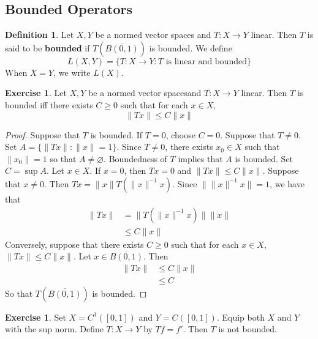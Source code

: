 \documentclass[12pt]{amsart}
\theoremstyle{definition}
\newtheorem{defn}[definition]{Definition}
\newtheorem{ex}[definition]{Exercise}
\newcommand{\lex}[1]{\label{ex:#1}}
\newcommand{\ld}[1]{\label{defn:#1}}
\begin{document}
	
	
	
	
	
	
	
	
	
	
	
	
	\newpage
	\subsection{Bounded Operators}
	
	\begin{defn} \ld{42001} 
		Let $X,Y$ be a normed vector spaces and $T:X \rightarrow Y$ linear. Then $T$ is said to be \textbf{bounded} if $T(\overline{B(0,1)})$ is bounded. We define $$L(X,Y) = \{T:X \rightarrow Y: T \text{ is linear and bounded}\}$$
		When $X=Y$, we write $L(X)$.
	\end{defn}
	
	\begin{ex} \ld{42001.1} 
		Let $X,Y$ be a normed vector spacesand $T:X \rightarrow Y$ linear. Then $T$ is bounded iff there exists $C \geq 0$ such that for each $x \in X$, $$\|Tx \|\leq C \|x \|$$ 
	\end{ex}
	
	\begin{proof}
	Suppose that $T$ is bounded. If $T = 0$, choose $C = 0$. Suppose that $T \neq 0$. Set $ A = \{\|Tx\|: \|x\| =1\}$. Since $T \neq 0$, there exists $x_0 \in X$ such that $\|x_0\| = 1$ so that $A \neq \varnothing$.  Boundedness of $T$ implies that $A$ is bounded. Set $C = \sup A$. Let $x \in X$. If $x = 0$, then $Tx = 0$ and $\|Tx\| \leq C \|x\|$. Suppose that $x \neq 0$. Then $Tx = \|x\| T(\|x\|^{-1} x)$. Since $\|\|x\|^{-1} x\| = 1$, we have that
	\begin{align*}
	\|Tx\|
	&= \|T(\|x\|^{-1} x)\| \|x\|  \\
	& \leq C\|x\| 
\end{align*}	
Conversely, suppose that there exists $C \geq 0$ such that for each $x \in X$, $\|Tx \|\leq C \|x \|$. Let $x \in \overline{B(0,1)}$. Then 
	\begin{align*}
	\|Tx\| 
	&\leq C \|x\| \\
	&\leq C
	\end{align*}
So that $T(\overline{B(0,1)})$ is bounded. 
	\end{proof}
	
	\begin{ex} \lex{42002}
	Set $X = C^{1}([0,1])$ and $Y = C([0,1])$. Equip both $X$ and $Y$ with the sup norm. Define $T:X \rightarrow Y$ by $Tf = f'$. Then $T$ is not bounded.
	\end{ex}
	
\end{document}
